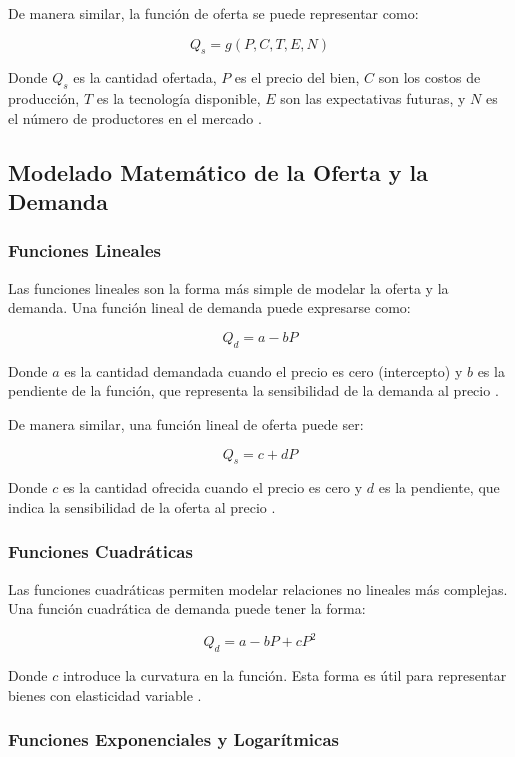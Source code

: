 \documentclass[12pt, a4paper]{article}
\begin{document}
De manera similar, la función de oferta se puede representar como:

\[Q_s = g(P, C, T, E, N)\]

Donde $Q_s$ es la cantidad ofertada, $P$ es el precio del bien, $C$ son los costos de producción, $T$ es la tecnología disponible, $E$ son las expectativas futuras, y $N$ es el número de productores en el mercado \parencite{mas2018}.

\subsection{Modelado Matemático de la Oferta y la Demanda}

\subsubsection{Funciones Lineales}

Las funciones lineales son la forma más simple de modelar la oferta y la demanda. Una función lineal de demanda puede expresarse como:

\[Q_d = a - bP\]

Donde $a$ es la cantidad demandada cuando el precio es cero (intercepto) y $b$ es la pendiente de la función, que representa la sensibilidad de la demanda al precio \parencite{chiang2005}.

De manera similar, una función lineal de oferta puede ser:

\[Q_s = c + dP\]

Donde $c$ es la cantidad ofrecida cuando el precio es cero y $d$ es la pendiente, que indica la sensibilidad de la oferta al precio \parencite{sydsaeter2014}.

\subsubsection{Funciones Cuadráticas}

Las funciones cuadráticas permiten modelar relaciones no lineales más complejas. Una función cuadrática de demanda puede tener la forma:

\[Q_d = a - bP + cP^2\]

Donde $c$ introduce la curvatura en la función. Esta forma es útil para representar bienes con elasticidad variable \parencite{varian2014}.

\subsubsection{Funciones Exponenciales y Logarítmicas}
\end{document}
